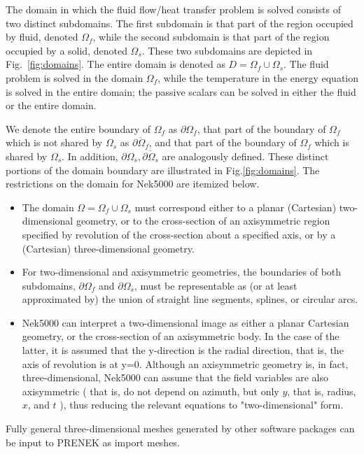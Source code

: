 The domain in which the fluid flow/heat transfer
problem is solved consists of two distinct subdomains. The
first subdomain is that part of the region occupied by
fluid, denoted \(\Omega_f\), while the second subdomain is that part
of the region occupied by a solid, denoted \(\Omega_s\). These two
subdomains are depicted in Fig.~\ref{fig:domains}. The entire domain is denoted as \(D=\Omega_f \cup \Omega_s\).
The fluid problem is solved in the domain \(\Omega_f\), while the
temperature in the energy equation is solved in the
entire domain; the passive scalars can be solved in either
the fluid or the entire domain.
  
We denote the entire boundary of \(\Omega_f\) as \(\partial \Omega_f\), that part
of the boundary of \(\Omega_f\) which is not shared by \(\Omega_s\) as
\(\overline{\partial \Omega_f}\), and
that part of the boundary of \(\Omega_f\) which is shared by \(\Omega_s\).
In addition, \(\partial \Omega_{s}, \overline{\partial \Omega_s}\) are analogously defined.
These distinct portions of the
domain boundary are illustrated in Fig.\ref{fig:domains}.
The restrictions on the domain for Nek5000 are itemized below.
\begin{itemize}
\item The domain \(\Omega=\Omega_f \cup \Omega_s\) must correspond either to a
  planar (Cartesian) two-dimensional geometry, or to the
  cross-section of an axisymmetric region specified by
  revolution of the cross-section about a specified axis, or
  by a (Cartesian) three-dimensional geometry.
\item For two-dimensional and axisymmetric geometries, the
  boundaries of both subdomains, \(\partial \Omega_f\) and
  \(\partial \Omega_s\), must be
  representable as (or at least approximated by) the union of
  straight line segments, splines, or circular arcs.
\item Nek5000 can interpret a two-dimensional image as either
  a planar Cartesian geometry, or
  the cross-section of an axisymmetric body. In the case of
  the latter, it is assumed that the y-direction is the radial
  direction, that is, the axis of revolution is at y=0.
  Although an axisymmetric geometry is, in fact,
  three-dimensional, Nek5000 can assume that the field variables
  are also axisymmetric ( that is, do not depend on azimuth,
  but only \(y\), that is, radius, \(x\), and \(t\) ), thus reducing the
  relevant equations to "two-dimensional" form.
\end{itemize}

Fully general three-dimensional meshes generated by other software
packages can be input to PRENEK as import meshes.

